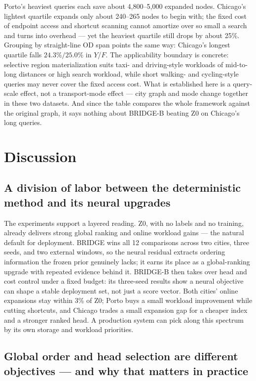 \documentclass[5p,twocolumn,authoryear]{elsarticle}
\newcommand{\zmethod}{Z0}
\newcommand{\gmethod}{BRIDGE}
\newcommand{\bmethod}{BRIDGE-B}
\begin{document}
Porto's heaviest queries each save about 4{,}800--5{,}000 expanded nodes. Chicago's
lightest quartile expands only about 240--265 nodes to begin with; the fixed cost of
endpoint access and shortcut scanning cannot amortize over so small a search and turns into
overhead --- yet the heaviest quartile still drops by about 25\%. Grouping by straight-line
OD span points the same way: Chicago's longest quartile falls $24.3\%/25.0\%$ in $Y$/$F$.
The applicability boundary is concrete: selective region materialization suits taxi- and
driving-style workloads of mid-to-long distances or high search workload, while short
walking- and cycling-style queries may never cover the fixed access cost. What is
established here is a query-scale effect, not a transport-mode effect --- city graph and
mode change together in these two datasets. And since the table compares the whole
framework against the original graph, it says nothing about \bmethod{} beating \zmethod{}
on Chicago's long queries.

\section{Discussion}

\subsection{A division of labor between the deterministic method and its neural upgrades}

The experiments support a layered reading. \zmethod, with no labels and no training,
already delivers strong global ranking and online workload gains --- the natural default for
deployment. \gmethod{} wins all 12 comparisons across two cities, three seeds, and two
external windows, so the neural residual extracts ordering information the frozen prior
genuinely lacks; it earns its place as a global-ranking upgrade with repeated evidence
behind it. \bmethod{} then takes over head and cost control under a fixed budget: its
three-seed results show a neural objective can shape a stable deployment set, not just a
score vector. Both cities' online expansions stay within 3\% of \zmethod; Porto buys a
small workload improvement while cutting shortcuts, and Chicago trades a small expansion
gap for a cheaper index and a stronger ranked head. A production system can pick along this
spectrum by its own storage and workload priorities.

\subsection{Global order and head selection are different objectives --- and why that
matters in practice}
\end{document}
